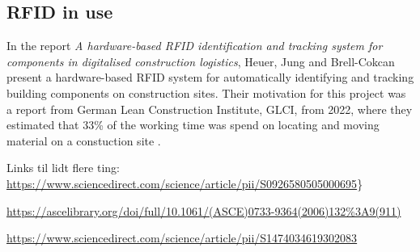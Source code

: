\subsection{RFID in use}

In the report \textit{A hardware-based RFID identification and tracking system for components in
digitalised construction logistics}\cite{Heuer2025}, Heuer, Jung and Brell-Cokcan present a hardware-based RFID system for automatically identifying and tracking building components on construction sites. Their motivation for this project was a report from German Lean Construction Institute, GLCI, from 2022, where they estimated that 33\% of the working time was spend on locating and moving material on a constuction site \cite{Przybilla2022}. 



Links til lidt flere ting:
\href{https://www.sciencedirect.com/science/article/pii/S0926580505000695}{https://www.sciencedirect.com/science/article/pii/S0926580505000695}\}

\href{https://ascelibrary.org/doi/full/10.1061/(ASCE)0733-9364(2006)132\%3A9(911)}{https://ascelibrary.org/doi/full/10.1061/(ASCE)0733-9364(2006)132\%3A9(911)}

\href{https://www.sciencedirect.com/science/article/pii/S1474034619302083}{https://www.sciencedirect.com/science/article/pii/S1474034619302083}

 
